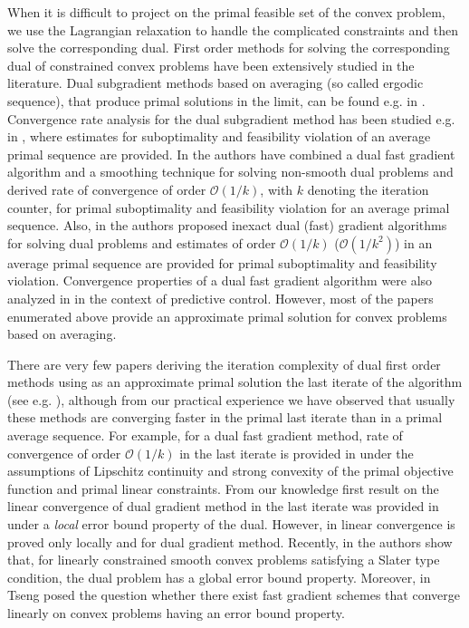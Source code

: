 \documentclass{gOMS2e}
\theoremstyle{plain}
\theoremstyle{definition}
\theoremstyle{remark}
\begin{document}
\noindent When it is difficult to project on the primal feasible set
of the  convex problem, we use the Lagrangian relaxation to handle
the complicated constraints and then solve the corresponding dual.
First order methods for solving  the corresponding dual of
constrained  convex problems  have been extensively studied in the
literature. Dual subgradient methods based on averaging (so called
ergodic sequence), that produce primal solutions in the limit, can
be found e.g. in  \cite{GusPat:14,KiwLar:07,LarPat:98}. Convergence
rate analysis for the dual subgradient method has been studied e.g.
in \cite{NedOzd:09}, where estimates  for suboptimality and feasibility
violation of an average primal sequence are provided.
In \cite{NecSuy:08} the authors have combined  a
dual fast gradient algorithm and a smoothing technique for solving
non-smooth dual problems and derived  rate of convergence of order
$\mathcal{O}\left(1/k\right)$, with $k$ denoting the
iteration counter,  for primal suboptimality and
feasibility violation for an average primal sequence.   Also, in
\cite{NecNed:13} the authors proposed inexact dual (fast) gradient
algorithms  for solving  dual problems and estimates of order
$\mathcal{O}\left(1/k\right)$ ($\mathcal{O}\left(1/k^2\right)$) in
an average primal sequence  are provided for  primal suboptimality
and feasibility violation. Convergence properties of a  dual fast
gradient algorithm were also analyzed in \cite{PatBem:12} in the
context of predictive control. However, most of the papers
enumerated above provide an approximate primal solution for convex
problems based on averaging.

\noindent There are very few papers deriving the iteration
complexity of dual first order methods using as an approximate
primal solution the last iterate of the algorithm (see e.g.
\cite{LuoTse:93a,NecNed:14a,BecNed:14,BecTeb:14}),
although from our practical experience we have observed that usually these methods are
converging faster in the primal last iterate than in a primal
average sequence. For example, for a dual fast gradient method, rate
of convergence of order $\mathcal{O}\left(1/k\right)$  in the last
iterate is provided in \cite{BecNed:14} under the assumptions of
Lipschitz continuity and strong convexity of the primal objective
function and primal linear constraints. From our knowledge first
result on the linear convergence of dual gradient method in the last
iterate was provided in \cite{LuoTse:93a} under a \textit{local}
error bound property of the dual. However, in \cite{LuoTse:93a}
linear convergence is proved only locally and  for dual gradient
method. Recently, in \cite{NecNed:14a} the authors show that, for
linearly constrained smooth convex problems satisfying a Slater type
condition, the dual problem has a global error
bound property. 
Moreover, in \cite{Tse:10} Tseng posed the question whether there
exist fast gradient schemes  that converge linearly on convex
problems having an error bound property.
\end{document}
